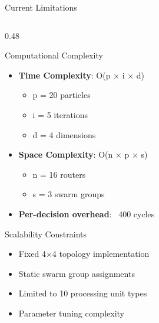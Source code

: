 \documentclass[10pt,aspectratio=169]{beamer}
\begin{document}
\begin{frame}{Current Limitations}
    \begin{columns}[T]
        \begin{column}{0.48\textwidth}
            \begin{block}{Computational Complexity}
                \begin{itemize}
                    \item \textbf{Time Complexity}: O(p × i × d)
                    \begin{itemize}
                        \item p = 20 particles
                        \item i = 5 iterations
                        \item d = 4 dimensions
                    \end{itemize}
                    \item \textbf{Space Complexity}: O(n × p × s)
                    \begin{itemize}
                        \item n = 16 routers
                        \item s = 3 swarm groups
                    \end{itemize}
                    \item \textbf{Per-decision overhead}: ~400 cycles
                \end{itemize}
            \end{block}
            
            \begin{alertblock}{Scalability Constraints}
                \begin{itemize}
                    \item Fixed 4×4 topology implementation
                    \item Static swarm group assignments
                    \item Limited to 10 processing unit types
                    \item Parameter tuning complexity
                \end{itemize}
            \end{alertblock}
        \end{column}
        

\end{columns}
\end{frame}
\end{document}
